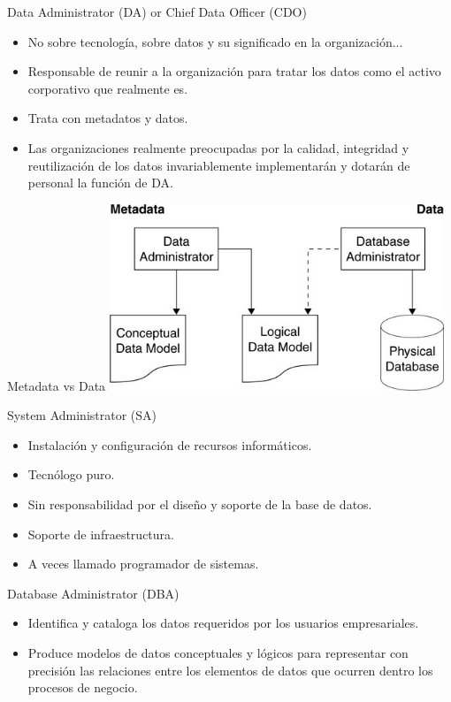 \documentclass{beamer}
\begin{document}
\begin{frame}{Data Administrator (DA) or Chief Data Officer (CDO)}
    \begin{itemize}
        \item No sobre tecnología, sobre datos y su significado en la organización...
        \item Responsable de reunir a la organización para tratar los datos como el activo corporativo que realmente es.
        \item Trata con metadatos y datos.
        \item Las organizaciones realmente preocupadas por la calidad, integridad y reutilización de los datos invariablemente implementarán y dotarán de personal la función de DA.
    \end{itemize}
\end{frame}

\begin{frame}{Metadata vs Data}
    \centering
    \includegraphics[width=0.75\textwidth]{figures/metadata2.png}
\end{frame}

\begin{frame}{System Administrator (SA)}
    \begin{itemize}
        \item Instalación y configuración de recursos informáticos.
        \item Tecnólogo puro.
        \item Sin responsabilidad por el diseño y soporte de la base de datos.
        \item Soporte de infraestructura.
        \item A veces llamado programador de sistemas.
    \end{itemize}
\end{frame}

\begin{frame}{Database Administrator (DBA)}
    \begin{itemize}
        \item Identifica y cataloga los datos requeridos por los usuarios empresariales.
        \item Produce modelos de datos conceptuales y lógicos para representar con precisión las relaciones entre los elementos de datos que ocurren dentro los procesos de negocio.
    \end{itemize}
\end{frame}
\end{document}
